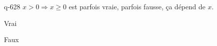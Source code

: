\begin{truefalse}{q-628}
$x > 0 \Rightarrow x \geq 0$ est parfois vraie, parfois fausse, ça dépend de $x$.
\item Vrai
\item* Faux
\end{truefalse}

